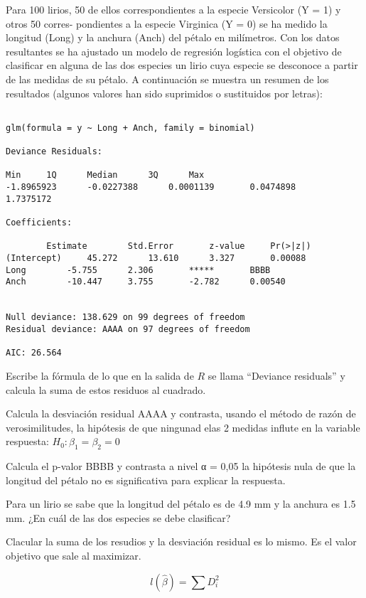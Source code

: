 \begin{problem}[3]
Para 100 lirios, 50 de ellos correspondientes a la especie Versicolor (Y = 1) y otros 50 corres-
pondientes a la especie Virginica (Y = 0) se ha medido la longitud (Long) y la anchura (Anch) del
pétalo en milímetros. Con los datos resultantes se ha ajustado un modelo de regresión logística con
el objetivo de clasificar en alguna de las dos especies un lirio cuya especie se desconoce a partir de las medidas de su pétalo. A continuación se muestra un resumen de los resultados 
(algunos valores han sido suprimidos o sustituidos por letras):


\begin{lstlisting}[style=mystyle]

glm(formula = y ~ Long + Anch, family = binomial)

Deviance Residuals:

Min		1Q		Median		3Q		Max
-1.8965923		-0.0227388		0.0001139		0.0474898		1.7375172

Coefficients:

		Estimate		Std.Error		z-value		Pr(>|z|)
(Intercept)		45.272		13.610		3.327		0.00088
Long		-5.755		2.306		*****		BBBB
Anch		-10.447		3.755		-2.782		0.00540


Null deviance: 138.629 on 99 degrees of freedom
Residual deviance: AAAA on 97 degrees of freedom

AIC: 26.564
\end{lstlisting}

\ppart Escribe la fórmula de lo que en la salida de $R$ se llama ``Deviance residuals'' y calcula la suma de estos residuos al cuadrado.

\ppart Calcula la desviación residual AAAA y contrasta, usando el método de razón de verosimilitudes, la hipótesis de que ningunad elas 2 medidas influte en la variable respuesta: $H_0: β_1 = β_2 = 0$

\ppart Calcula el p-valor BBBB y contrasta a nivel α = 0,05 la hipótesis nula de que la longitud del
pétalo no es significativa para explicar la respuesta.

\ppart Para un lirio se sabe que la longitud del pétalo es de 4.9 mm y la anchura es 1.5 mm. ¿En cuál
de las dos especies se debe clasificar?

\solution

\spart Clacular la suma de los resudios y la desviación residual es lo mismo. Es el valor objetivo que sale al maximizar.

\[
	l(\hat{β}) = \sum D_i^2
\]


\end{problem}
